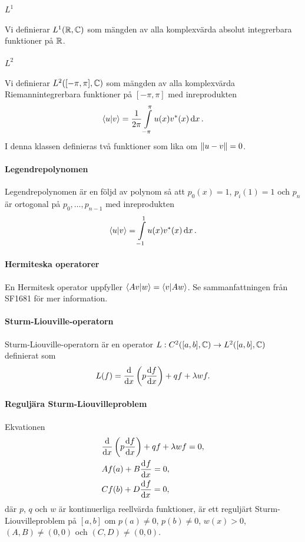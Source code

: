 \paragraph{$L^{1}$}
Vi definierar $L^{1}(\mathbb{R}, \mathbb{C})$ som mängden av alla komplexvärda absolut integrerbara funktioner på $\mathbb{R}$.

\paragraph{$L^{2}$}
Vi definierar $L^{2}([-\pi, \pi], \mathbb{C})$ som mängden av alla komplexvärda Riemannintegrerbara funktioner på $[-\pi, \pi]$ med inreprodukten
\begin{align*}
	\bra{u}\ket{v} = \frac{1}{2\pi}\int\limits_{-\pi}^{\pi}u(x)v^{*}(x)\dd{x}.
\end{align*}
I denna klassen definieras två funktioner som lika om $\norm{u - v} = 0$.

\paragraph{Legendrepolynomen}
Legendrepolynomen är en följd av polynom så att $p_{0}(x) = 1$, $p_{i}(1) = 1$ och $p_{n}$ är ortogonal på $p_{0}, \dots, p_{n - 1}$ med inreprodukten
\begin{align*}
	\bra{u}\ket{v} = \int\limits_{-1}^{1}u(x)v^{*}(x)\dd{x}.
\end{align*}

\paragraph{Hermiteska operatorer}
En Hermitesk operator uppfyller $\bra{Av}\ket{w} = \bra{v}\ket{Aw}$. Se sammanfattningen från SF1681 för mer information.

\paragraph{Sturm-Liouville-operatorn}
Sturm-Liouville-operatorn är en operator $L: C^{2}([a, b], \mathbb{C}) \to L^{2}([a, b], \mathbb{C})$ definierat som
\begin{align*}
	L(f) = \dv{x}\left(p\dv{f}{x}\right) + qf + \lambda wf.
\end{align*}

\paragraph{Reguljära Sturm-Liouvilleproblem}
Ekvationen
\begin{align*}
	&\dv{x}\left(p\dv{f}{x}\right) + qf + \lambda wf = 0, \\
	&Af(a) + B\dv[]{f}{x} (a) = 0, \\
	&Cf(b) + D\dv[]{f}{x} (b) = 0,
\end{align*}
där $p$, $q$ och $w$ är kontinuerliga reellvärda funktioner, är ett reguljärt Sturm-Liouvilleproblem på $[a, b]$ om $p(a) \neq 0$, $p(b) \neq 0$,  $w(x) > 0$, $(A, B) \neq (0, 0)$ och $(C, D) \neq (0, 0)$.

